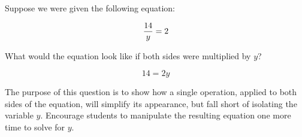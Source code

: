 

Suppose we were given the following equation:

$${14 \over y} = 2$$

What would the equation look like if both sides were multiplied by $y$?







$$14 = 2y$$







The purpose of this question is to show how a single operation, applied to both sides of the equation, will simplify its appearance, but fall short of isolating the variable $y$.  Encourage students to manipulate the resulting equation one more time to solve for $y$.





